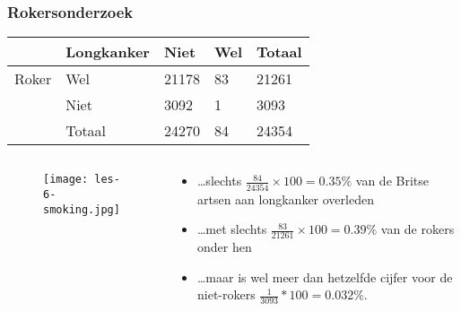 \documentclass[aspectratio=169]{beamer}
\begin{document}
\begin{frame}
  \frametitle{Rokersonderzoek}
  \begin{table}[h]
    \begin{tabular}{@{}lllll@{}}
      \toprule
      & \textbf{Longkanker} & \textbf{Niet} & \textbf{Wel} & \textbf{Totaal} \\ \midrule
      Roker & Wel                 & 21178         & 83           & 21261           \\
      & Niet                & 3092          & 1            & 3093            \\
      & Totaal              & 24270         & 84           & 24354           \\ \bottomrule
    \end{tabular}
  \end{table}
  
  \begin{columns}
    \begin{column}{0.3 \textwidth}
      
      \begin{figure}
        \centering
        \texttt{[image: les-6-smoking.jpg]}
      \end{figure}
      
    \end{column}
    \begin{column}{0.7 \textwidth}
      
      \begin{itemize}
        \item \dots slechts $\frac{84}{ 24354} \times 100 = 0.35\% $ van de Britse artsen aan longkanker overleden
        \item \dots met slechts $\frac{83}{21261} \times 100 = 0.39\%$ van de rokers onder hen
        \item \dots maar  is wel  meer dan hetzelfde cijfer voor de niet-rokers $\frac{1}{3093} * 100 = 0.032\%$.
      \end{itemize}
    \end{column}
  \end{columns}
\end{frame}
\end{document}
